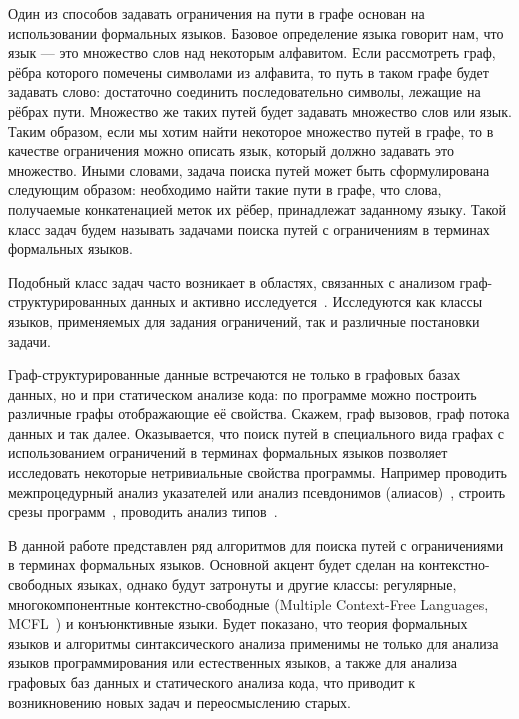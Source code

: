 Один из способов задавать ограничения на пути в графе основан на использовании формальных языков.
Базовое определение языка говорит нам, что язык --- это множество слов над некоторым алфавитом.
Если рассмотреть граф, рёбра которого помечены символами из алфавита, то путь в таком графе будет задавать слово: достаточно соединить последовательно символы, лежащие на рёбрах пути.
Множество же таких путей будет задавать множество слов или язык.
Таким образом, если мы хотим найти некоторое множество путей в графе, то в качестве ограничения можно описать язык, который должно задавать это множество.
Иными словами, задача поиска путей может быть сформулирована следующим образом: необходимо найти такие пути в графе, что слова, получаемые конкатенацией меток их рёбер, принадлежат заданному языку.
Такой класс задач будем называть задачами поиска путей с ограничениям в терминах формальных языков.

Подобный класс задач часто возникает в областях, связанных с анализом граф-структурированных данных и активно исследуется~.
Исследуются как классы языков, применяемых для задания ограничений, так и различные постановки задачи.

Граф-структурированные данные встречаются не только в графовых базах данных, но и при статическом анализе кода: по программе можно построить различные графы отображающие её свойства.
Скажем, граф вызовов, граф потока данных и так далее.
Оказывается, что поиск путей в специального вида графах с использованием ограничений в терминах формальных языков позволяет исследовать некоторые нетривиальные свойства программы.
Например проводить межпроцедурный анализ указателей или анализ псевдонимов (алиасов)~, строить срезы программ~, проводить анализ типов~.

В данной работе представлен ряд алгоритмов для поиска путей с ограничениями в терминах формальных языков.
Основной акцент будет сделан на контекстно-свободных языках, однако будут затронуты и другие классы: регулярные, многокомпонентные контекстно-свободные (Multiple Context-Free Languages, MCFL~) и конъюнктивные языки.
Будет показано, что теория формальных языков и алгоритмы синтаксического анализа применимы не только для анализа языков программирования или естественных языков, а также для анализа графовых баз данных и статического анализа кода, что приводит к возникновению новых задач и переосмыслению старых.


